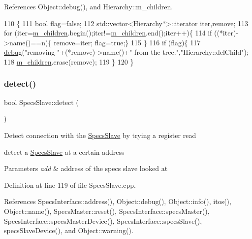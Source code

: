 References Object\+::debug(), and Hierarchy\+::m\+\_\+children.


\begin{DoxyCode}
110                                    \{
111   \textcolor{keywordtype}{bool} flag=\textcolor{keyword}{false};
112   std::vector<Hierarchy*>::iterator iter,\textcolor{keyword}{remove};
113   \textcolor{keywordflow}{for} (iter=\hyperlink{classHierarchy_a038816763941fd4a930504917f60483b}{m\_children}.begin();iter!=\hyperlink{classHierarchy_a038816763941fd4a930504917f60483b}{m\_children}.end();iter++)\{
114     \textcolor{keywordflow}{if} ((*iter)->name()==n)\{ \textcolor{keyword}{remove}=iter; flag=\textcolor{keyword}{true};\}
115   \}
116   \textcolor{keywordflow}{if} (flag)\{
117     \hyperlink{classObject_aac010553f022165573714b7014a15f0d}{debug}(\textcolor{stringliteral}{"removing "}+(*remove)->name()+\textcolor{stringliteral}{" from the tree."},\textcolor{stringliteral}{"Hierarchy::delChild"});
118     \hyperlink{classHierarchy_a038816763941fd4a930504917f60483b}{m\_children}.erase(\textcolor{keyword}{remove});
119   \}
120 \}
\end{DoxyCode}
\mbox{\label{classSpecsSlave_aa1411ca849bda04215518b08535185e2}} 
\subsubsection{\texorpdfstring{detect()}{detect()}}
{\footnotesize\ttfamily bool Specs\+Slave\+::detect (\begin{DoxyParamCaption}{ }\end{DoxyParamCaption})}

Detect connection with the \hyperlink{classSpecsSlave}{Specs\+Slave} by trying a register read

detect a \hyperlink{classSpecsSlave}{Specs\+Slave} at a certain address


\begin{DoxyParams}{Parameters}
{\em add} & address of the specs slave looked at \\
\hline
\end{DoxyParams}


Definition at line 119 of file Specs\+Slave.\+cpp.



References Specs\+Interface\+::address(), Object\+::debug(), Object\+::info(), itos(), Object\+::name(), Specs\+Master\+::reset(), Specs\+Interface\+::specs\+Master(), Specs\+Interface\+::specs\+Master\+Device(), Specs\+Interface\+::specs\+Slave(), specs\+Slave\+Device(), and Object\+::warning().



